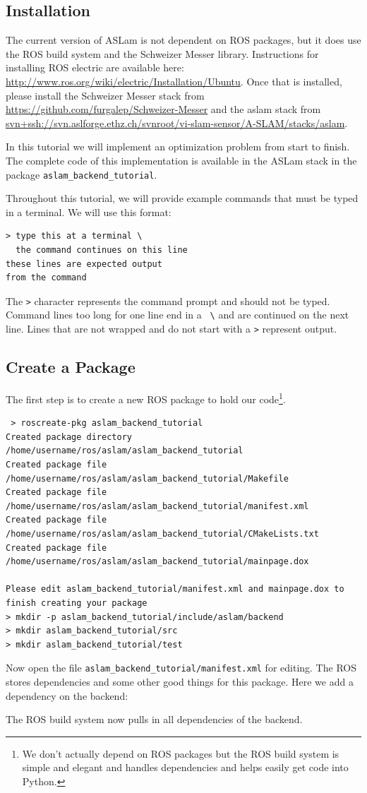 \documentclass[11pt,a4,oneside]{article}
\newcommand{\txt}[1]{{\footnotesize\texttt{#1}}}
\newcommand{\rospack}[1]{\href{http://www.ros.org/wiki/#1}{{\rosfont{#1}}}}
\newcommand{\surl}[1]{{\footnotesize\url{#1}}}
\newcommand{\listxmlrange}[4]{}
\begin{document}
\subsection{Installation}
The current version of ASLam is not dependent on ROS packages, but it does use the ROS build system and the Schweizer Messer library. Instructions for installing ROS electric are available here: \surl{http://www.ros.org/wiki/electric/Installation/Ubuntu}. Once that is installed, please install the Schweizer Messer stack from \surl{https://github.com/furgalep/Schweizer-Messer} and the aslam stack from \surl{svn+ssh://svn.aslforge.ethz.ch/svnroot/vi-slam-sensor/A-SLAM/stacks/aslam}.

In this tutorial we will implement an optimization problem from start to finish. The complete code of this implementation is available in the ASLam stack in the package \txt{aslam\_backend\_tutorial}.

Throughout this tutorial, we will provide example commands that must be typed in a terminal. We will use this format:
\begin{lstlisting}
> type this at a terminal \
  the command continues on this line
these lines are expected output
from the command
\end{lstlisting}
The \txt{\textgreater} character represents the command prompt and should not be typed. Command lines too long for one line end in a \txt{ \textbackslash } and are continued on the next line. Lines that are not wrapped and do not start with a \txt{\textgreater} represent output.

\subsection{Create a Package}
The first step is to create a new ROS package to hold our code\footnote{We don't actually depend on ROS packages but the ROS build system is simple and elegant and handles dependencies and helps easily get code into Python.}. 
\begin{lstlisting}
 > roscreate-pkg aslam_backend_tutorial
Created package directory /home/username/ros/aslam/aslam_backend_tutorial
Created package file /home/username/ros/aslam/aslam_backend_tutorial/Makefile
Created package file /home/username/ros/aslam/aslam_backend_tutorial/manifest.xml
Created package file /home/username/ros/aslam/aslam_backend_tutorial/CMakeLists.txt
Created package file /home/username/ros/aslam/aslam_backend_tutorial/mainpage.dox

Please edit aslam_backend_tutorial/manifest.xml and mainpage.dox to finish creating your package
> mkdir -p aslam_backend_tutorial/include/aslam/backend
> mkdir aslam_backend_tutorial/src
> mkdir aslam_backend_tutorial/test
\end{lstlisting}
Now open the file \txt{aslam\_backend\_tutorial/manifest.xml} for editing. The ROS \rospack{Manifest} stores dependencies and some other good things for this package. Here we add a dependency on the backend:
\listxmlrange{manifest.xml}{../../aslam_backend_tutorial/manifest.xml}{12}{13}
The ROS build system now pulls in all dependencies of the backend.
\end{document}
